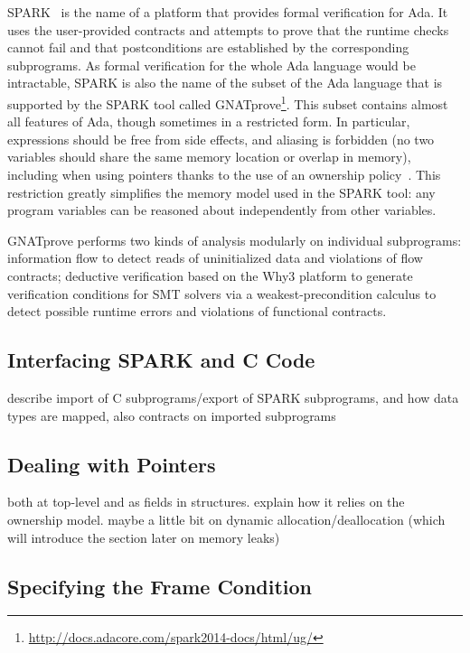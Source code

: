 \documentclass[runningheads]{llncs}
\begin{document}
SPARK~\cite{mccormick2015building} is the name of a platform that provides
formal verification for Ada. It uses the user-provided contracts and attempts
to prove that the runtime checks cannot fail and that postconditions are
established by the corresponding subprograms.  As formal verification for the
whole Ada language would be intractable, SPARK is also the name of the subset
of the Ada language that is supported by the SPARK tool called
GNATprove\footnote{\url{http://docs.adacore.com/spark2014-docs/html/ug/}}.
This subset contains almost all features of Ada, though sometimes in a
restricted form.  In particular, expressions should be free from side effects,
and aliasing is forbidden (no two variables should share the same memory
location or overlap in memory), including when using pointers thanks to the use
of an ownership policy~\cite{dross2020recursive}.  This restriction greatly
simplifies the memory model used in the SPARK tool: any program variables can
be reasoned about independently from other variables.

GNATprove performs two kinds of analysis modularly on individual subprograms:
information flow to detect reads of uninitialized data and violations of flow
contracts; deductive verification based on the Why3 platform to generate
verification conditions for SMT solvers via a weakest-precondition calculus to
detect possible runtime errors and violations of functional contracts.

\subsection{Interfacing SPARK and C Code}

describe import of C subprograms/export of SPARK subprograms, and how data
types are mapped, also contracts on imported subprograms

\subsection{Dealing with Pointers}

both at top-level and as fields in structures. explain how it relies on the
ownership model. maybe a little bit on dynamic allocation/deallocation (which
will introduce the section later on memory leaks)

\subsection{Specifying the Frame Condition}
\end{document}
